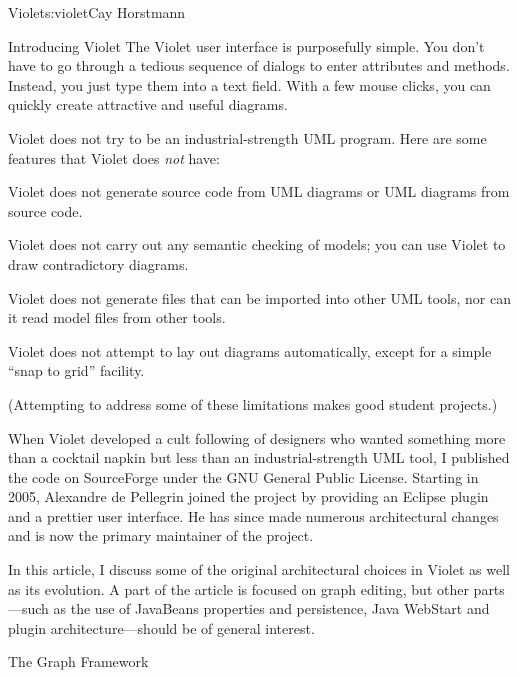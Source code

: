 \begin{aosachapter}{Violet}{s:violet}{Cay Horstmann}
\begin{aosasect1}{Introducing Violet}
The Violet user interface is purposefully simple. You don't have to go
through a tedious sequence of dialogs to enter attributes and
methods. Instead, you just type them into a text field. With a few
mouse clicks, you can quickly create attractive and useful diagrams.

Violet does not try to be an industrial-strength UML program. Here are
some features that Violet does \emph{not} have:

\begin{aosaitemize}

\item Violet does not generate source code from UML diagrams or UML
  diagrams from source code.

\item Violet does not carry out any semantic checking of models; you
  can use Violet to draw contradictory diagrams.

\item Violet does not generate files that can be imported into other
  UML tools, nor can it read model files from other tools.

\item Violet does not attempt to lay out diagrams automatically,
  except for a simple ``snap to grid'' facility.

\end{aosaitemize}

\noindent (Attempting to address some of these limitations makes good student
projects.)

When Violet developed a cult following of designers who wanted
something more than a cocktail napkin but less than an
industrial-strength UML tool, I published the code on SourceForge
under the GNU General Public License. Starting in 2005, Alexandre de Pellegrin
joined the project by providing an Eclipse plugin and a prettier user
interface. He has since made numerous architectural changes and is now
the primary maintainer of the project.

In this article, I discuss some of the original architectural choices
in Violet as well as its evolution. A part of the article is focused
on graph editing, but other parts---such as the use of JavaBeans
properties and persistence, Java WebStart and plugin
architecture---should be of general interest.

\end{aosasect1}

\begin{aosasect1}{The Graph Framework}


\end{aosasect1}
\end{aosachapter}
